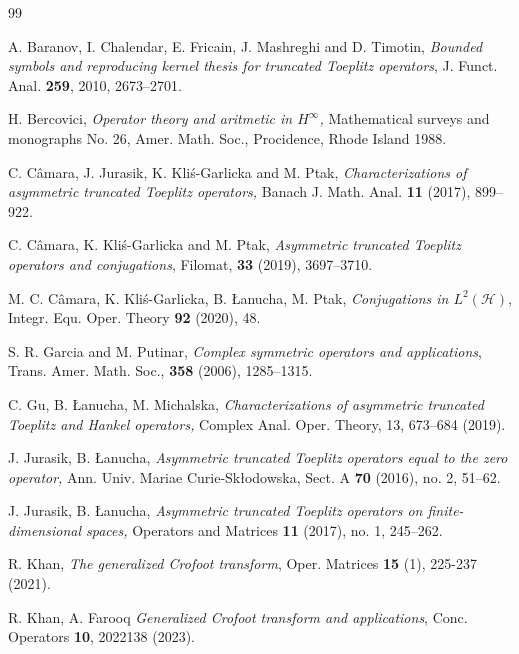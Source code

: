 \documentclass[11pt]{amsart}
\numberwithin{equation}{section}
\theoremstyle{definition}
\numberwithin{equation}{section}
\begin{document}
\begin{thebibliography}{99}
	
	{A. Baranov, I. Chalendar, E. Fricain, J. Mashreghi and D. Timotin},
	\textit{Bounded symbols and reproducing kernel thesis for truncated Toeplitz operators},
	J. Funct. Anal. {\bf 259}, 2010, 2673--2701.
	
	
{H. Bercovici},
\textit{Operator theory and aritmetic in $H^\infty$,} Mathematical surveys and monographs No. 26, Amer. Math. Soc., Procidence, Rhode Island 1988.
	
	
	
	
	{C. C\^{a}mara, J. Jurasik, K. Kli\'s-Garlicka and M. Ptak}, \textit{Characterizations of asymmetric truncated Toeplitz operators,} Banach J. Math. Anal. {\bf 11} (2017), 899--922.
	
	
	{C. C\^{a}mara, K. Kli\'s-Garlicka and M. Ptak},
	\textit{Asymmetric truncated Toeplitz operators and conjugations},
	Filomat, {\bf 33} (2019), 3697--3710.

	M. C. C\^amara, K. Kli\'{s}-Garlicka, B. \L anucha, M. Ptak,  \emph{Conjugations in $L^2(\mathcal {H})$}, Integr. Equ. Oper. Theory \textbf{92} (2020), 48.

{S. R. Garcia and M. Putinar}, \textit{Complex symmetric operators and applications}, Trans. Amer. Math. Soc., {\bf 358} (2006), 1285--1315.


C. Gu, B. \L anucha, M. Michalska, \textit{Characterizations of asymmetric
	truncated Toeplitz and Hankel operators,} Complex Anal. Oper. Theory, 13, 673--684 (2019).	

J. Jurasik, B. \L anucha, \textit{Asymmetric truncated Toeplitz operators equal to the zero operator,} Ann. Univ. Mariae Curie-Sk\l odowska, Sect. A \textbf{70} (2016), no. 2, 51--62.

J. Jurasik, B. \L anucha, \textit{Asymmetric truncated Toeplitz operators on finite-dimensional spaces,} Operators and Matrices \textbf{11} (2017), no. 1, 245--262.

R. Khan, \textit{The generalized Crofoot transform}, Oper. Matrices {\bf15} (1), 225-237 (2021).


R. Khan, A. Farooq  \textit{ Generalized Crofoot transform and applications}, Conc. Operators {\bf10}, 2022138 (2023).


\end{thebibliography}
\end{document}

